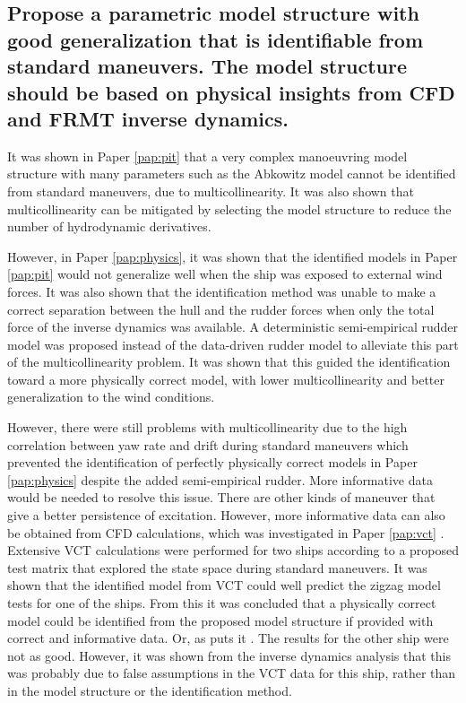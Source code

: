 \subsection*{Propose a parametric model structure with good generalization that is identifiable from standard maneuvers. The model structure should be based on physical insights from CFD and FRMT inverse dynamics.}
It was shown in Paper \ref{pap:pit}  that a very complex manoeuvring model structure with many parameters such as the Abkowitz model cannot be identified from standard maneuvers, due to multicollinearity.  
It was also shown that multicollinearity can be mitigated by selecting the model structure to reduce the number of hydrodynamic derivatives.

However, in Paper \ref{pap:physics}, it was shown that the identified models in Paper \ref{pap:pit} would not generalize well when the ship was exposed to external wind forces. 
It was also shown that the identification method was unable to make a correct separation between the hull and the rudder forces when only the total force of the inverse dynamics was available. 
A deterministic semi-empirical rudder model was proposed instead of the data-driven rudder model to alleviate this part of the multicollinearity problem. It was shown that this guided the identification toward a more physically correct model, with lower multicollinearity and better generalization to the wind conditions. 

However, there were still problems with multicollinearity due to the high correlation between yaw rate and drift during standard maneuvers which prevented the identification of perfectly physically correct models in Paper \ref{pap:physics} despite the added semi-empirical rudder. More informative data would be needed to resolve this issue. There are other kinds of maneuver that give a better persistence of excitation. However, more informative data can also be obtained from CFD calculations, which was investigated in Paper \ref{pap:vct} . Extensive VCT calculations were performed for two ships according to a proposed test matrix that explored the state space during standard maneuvers.
It was shown that the identified model from VCT could well predict the zigzag model tests for one of the ships. From this it was concluded that a physically correct model could be identified from the proposed model structure if provided with correct and informative data. Or, as \textcite{revestidoherreroTwostepIdentificationNonlinear2012} puts it .
The results for the other ship were not as good.  However, it was shown from the inverse dynamics analysis that this was probably due to false assumptions in the VCT data for this ship, rather than in the model structure or the identification method.  


